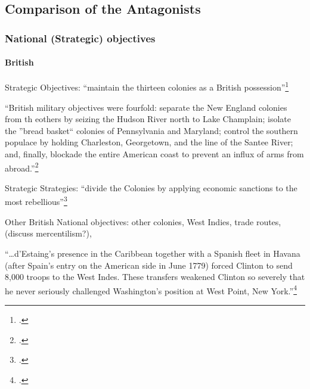 \subsection{Comparison of the Antagonists}

% 



\subsubsection{National (Strategic) objectives}


\paragraph{British}

Strategic Objectives: ``maintain the thirteen colonies as a British possession''\footcite[2]{moncure_cowpens_1996}

``British military objectives were fourfold: separate the New England colonies from th eothers by seizing the Hudson River north to Lake Champlain; isolate the ''bread basket`` colonies of Pennsylvania and Maryland; control the southern populace by holding Charleston, Georgetown, and the line of the Santee River; and, finally, blockade the entire American coast to prevent an influx of arms from abroad.''\footcite[2]{moncure_cowpens_1996}

Strategic Strategies: ``divide the Colonies by applying economic sanctions to the most rebellious''\footcite[2]{moncure_cowpens_1996}

Other British National objectives: other colonies, West Indies, trade routes, (discuss mercentilism?), 

``\ldots d'Estaing's presence in the Caribbean together with a Spanish fleet in Havana (after Spain's entry on the American side in June 1779) forced Clinton to send 8,000 troops to the West Indes. These transfers weakened Clinton so severely that he never seriously challenged Washington's position at West Point, New York.''\footcite[10]{moncure_cowpens_1996}

